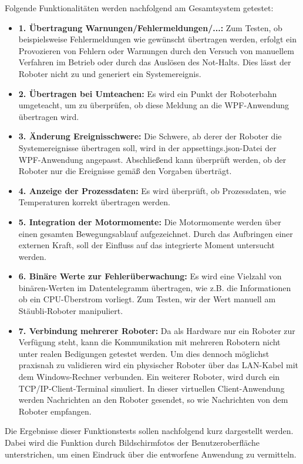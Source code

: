 \documentclass[ a4paper,
                oneside,
                toc=bibliography,
                toc=listof
                ]{scrbook}
\begin{document}
   	\noindent
   	Folgende Funktionalitäten werden nachfolgend am Gesamtsystem getestet:\\
   	\begin{itemize}
   		\item \textbf{1. Übertragung Warnungen/Fehlermeldungen/...:} Zum Testen, ob beispielsweise Fehlermeldungen wie gewünscht übertragen werden, erfolgt ein Provozieren von Fehlern oder Warnungen durch den Versuch von manuellem Verfahren im Betrieb oder durch das Auslösen des Not-Halts. Dies lässt der Roboter nicht zu und generiert ein Systemereignis.
   		\item \textbf{2. Übertragen bei Umteachen:} Es wird ein Punkt der Roboterbahn umgeteacht, um zu überprüfen, ob diese Meldung an die WPF-Anwendung übertragen wird.
   		\item \textbf{3. Änderung Ereignisschwere:} Die Schwere, ab derer der Roboter die Systemereignisse übertragen soll, wird in der appsettings.json-Datei der WPF-Anwendung angepasst. Abschließend kann überprüft werden, ob der Roboter nur die Ereignisse gemäß den Vorgaben überträgt.
   		\item \textbf{4. Anzeige der Prozessdaten:} Es wird überprüft, ob Prozessdaten, wie Temperaturen korrekt übertragen werden.
   		\item \textbf{5. Integration der Motormomente:} Die Motormomente werden über einen gesamten Bewegungsablauf aufgezeichnet. Durch das Aufbringen einer externen Kraft, soll der Einfluss auf das integrierte Moment untersucht werden.
   		\item \textbf{6. Binäre Werte zur Fehlerüberwachung: } Es wird eine Vielzahl von binären-Werten im Datentelegramm übertragen, wie z.B. die Informationen ob ein CPU-Überstrom vorliegt. Zum Testen, wir der Wert manuell am Stäubli-Roboter manipuliert.
   		\item \textbf{7. Verbindung mehrerer Roboter: } Da als Hardware nur ein Roboter zur Verfügung steht, kann die Kommunikation mit mehreren Robotern nicht unter realen Bedigungen getestet werden. Um dies dennoch möglichst praxisnah zu validieren wird ein physischer Roboter über das LAN-Kabel mit dem Windows-Rechner verbunden. Ein weiterer Roboter, wird durch ein TCP/IP-Client-Terminal simuliert. In dieser virtuellen Client-Anwendung werden Nachrichten an den Roboter gesendet, so wie Nachrichten von dem Roboter empfangen.
   	\end{itemize}
   	Die Ergebnisse dieser Funktionstests sollen nachfolgend kurz dargestellt werden. Dabei wird die Funktion durch Bildschirmfotos der Benutzeroberfläche unterstrichen, um einen Eindruck über die entworfene Anwendung zu vermitteln.\\
\end{document}
